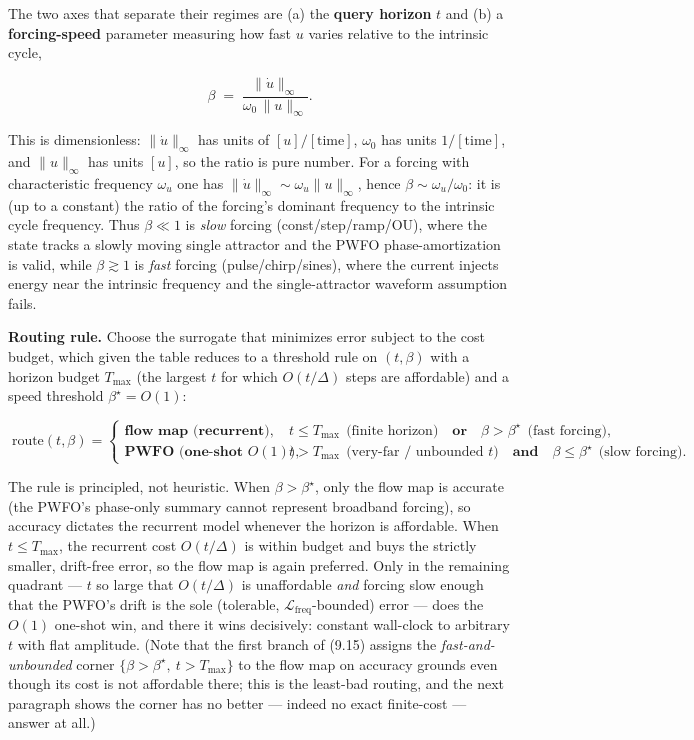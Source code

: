 \documentclass[
  11pt,
]{article}
\providecommand{\gt}{>}
\begin{document}
The two axes that separate their regimes are (a) the \textbf{query
horizon} \(t\) and (b) a \textbf{forcing-speed} parameter measuring how
fast \(u\) varies relative to the intrinsic cycle,

\[
\beta \;=\; \frac{\big\lVert \dot{u}\big\rVert_{\infty}}{\omega_0\,\big\lVert u\big\rVert_{\infty}} .
\tag{9.14}
\]

This is dimensionless: \(\|\dot u\|_\infty\) has units of
\([u]/[\text{time}]\), \(\omega_0\) has units \(1/[\text{time}]\), and
\(\|u\|_\infty\) has units \([u]\), so the ratio is pure number. For a
forcing with characteristic frequency \(\omega_u\) one has
\(\|\dot u\|_\infty\sim\omega_u\|u\|_\infty\), hence
\(\beta\sim\omega_u/\omega_0\): it is (up to a constant) the ratio of
the forcing's dominant frequency to the intrinsic cycle frequency. Thus
\(\beta\!\ll\!1\) is \emph{slow} forcing (const/step/ramp/OU), where the
state tracks a slowly moving single attractor and the PWFO
phase-amortization is valid, while \(\beta\!\gtrsim\!1\) is \emph{fast}
forcing (pulse/chirp/sines), where the current injects energy near the
intrinsic frequency and the single-attractor waveform assumption fails.

\textbf{Routing rule.} Choose the surrogate that minimizes error subject
to the cost budget, which given the table reduces to a threshold rule on
\((t,\beta)\) with a horizon budget \(T_{\max}\) (the largest \(t\) for
which \(O(t/\Delta)\) steps are affordable) and a speed threshold
\(\beta^\star=O(1)\):

\[
\boxed{\;
\text{route}(t,\beta)=
\begin{cases}
\textbf{flow map (recurrent)}, & t\le T_{\max}\ \ \text{(finite horizon)}\quad\textbf{or}\quad \beta\gt \beta^\star\ \ \text{(fast forcing)},\\[4pt]
\textbf{PWFO (one-shot }O(1)\textbf{)}, & t\gt  T_{\max}\ \ \text{(very-far / unbounded }t)\quad\textbf{and}\quad \beta\le\beta^\star\ \ \text{(slow forcing)}.
\end{cases}\;}
\tag{9.15}
\]

The rule is principled, not heuristic. When \(\beta\gt \beta^\star\),
only the flow map is accurate (the PWFO's phase-only summary cannot
represent broadband forcing), so accuracy dictates the recurrent model
whenever the horizon is affordable. When \(t\le T_{\max}\), the
recurrent cost \(O(t/\Delta)\) is within budget and buys the strictly
smaller, drift-free error, so the flow map is again preferred. Only in
the remaining quadrant --- \(t\) so large that \(O(t/\Delta)\) is
unaffordable \emph{and} forcing slow enough that the PWFO's drift is the
sole (tolerable, \(\mathcal L_{\text{freq}}\)-bounded) error --- does
the \(O(1)\) one-shot win, and there it wins decisively: constant
wall-clock to arbitrary \(t\) with flat amplitude. (Note that the first
branch of (9.15) assigns the \emph{fast-and-unbounded} corner
\(\{\beta\gt \beta^\star,\ t\gt T_{\max}\}\) to the flow map on accuracy
grounds even though its cost is not affordable there; this is the
least-bad routing, and the next paragraph shows the corner has no better
--- indeed no exact finite-cost --- answer at all.)
\end{document}
